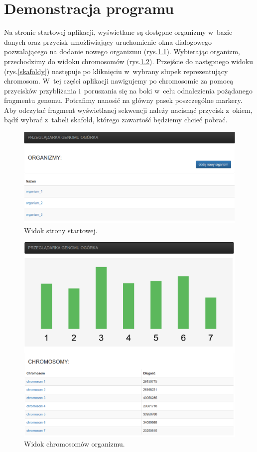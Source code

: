 \documentclass[a4paper,12pt,oneside]{mwrep}  %
\begin{document}
\chapter{Demonstracja programu}
Na stronie startowej aplikacji, wyświetlane są dostępne organizmy w~bazie danych oraz przycisk umożliwiający uruchomienie okna dialogowego pozwalającego na dodanie nowego organizmu (rys.\ref{home}). Wybierając organizm, przechodzimy do widoku chromosomów (rys.\ref{chromosomy}). Przejście do następnego widoku (rys.\ref{skafoldy}) następuje po kliknięciu w~wybrany słupek reprezentujący chromosom. W~tej części aplikacji nawigujemy po chromosomie za pomocą  przycisków przybliżania i~poruszania się na boki w~celu odnalezienia pożądanego fragmentu genomu. Potrafimy nanosić na główny pasek poszczególne markery. Aby odczytać fragment wyświetlanej sekwencji należy nacisnąć przycisk z~okiem, bądź wybrać z~tabeli skafold, którego zawartość będziemy chcieć pobrać.
\vspace{3cm}
\begin{figure}[!h]
\centering
\includegraphics[width=1\textwidth]{grafika/home.png}
\caption{Widok strony startowej.}
\label{home}
\end{figure}
\begin{figure}[!h]
\centering
\includegraphics[width=1\textwidth]{grafika/chromosomy.png}
\caption{Widok chromosomów organizmu.}
\label{chromosomy}
\end{figure}
\end{document}
